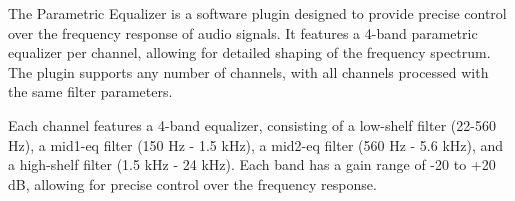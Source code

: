 The Parametric Equalizer is a software plugin designed to provide precise control over the frequency response of audio signals. It features a 4-band parametric equalizer per channel, allowing for detailed shaping of the frequency spectrum. The plugin supports any number of channels, with all channels processed with the same filter parameters.

Each channel features a 4-band equalizer, consisting of a low-shelf filter (22-560 Hz), a mid1-eq filter (150 Hz - 1.5 kHz), a mid2-eq filter (560 Hz - 5.6 kHz), and a high-shelf filter (1.5 kHz - 24 kHz). Each band has a gain range of -20 to +20 dB, allowing for precise control over the frequency response.




